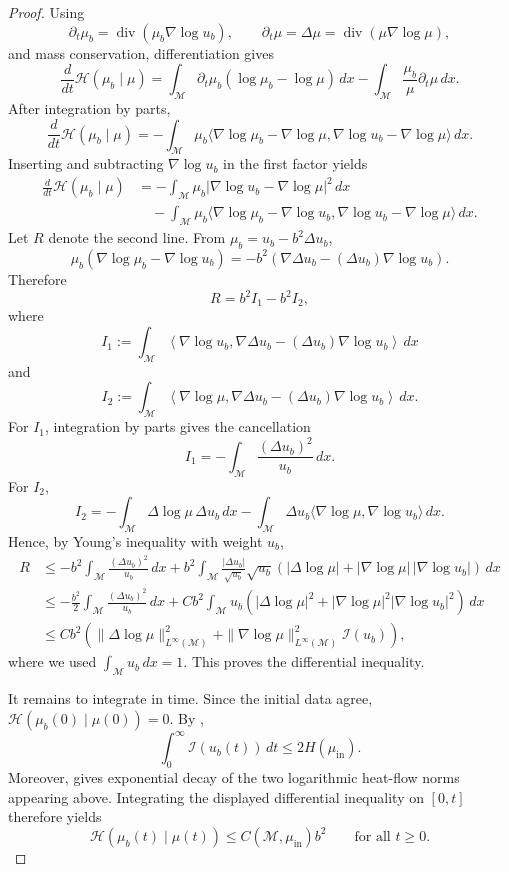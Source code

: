 \documentclass[11pt]{article}
\theoremstyle{definition}
\newcommand{\divg}{\operatorname{div}}
\def\M{\mathcal M}
\begin{document}
\begin{proof}
Using
\[
\partial_t\mu_b=\divg(\mu_b\nabla\log u_b),
\qquad
\partial_t\mu=\Delta\mu=\divg(\mu\nabla\log\mu),
\]
and mass conservation, differentiation gives
\[
\frac{d}{dt}\mathcal H(\mu_b\mid\mu)
=
\int_\M \partial_t\mu_b(\log\mu_b-\log\mu)\,dx
-\int_\M \frac{\mu_b}{\mu}\partial_t\mu\,dx .
\]
After integration by parts,
\[
\frac{d}{dt}\mathcal H(\mu_b\mid\mu)
=
-\int_\M
\mu_b\langle\nabla\log\mu_b-\nabla\log\mu,
\nabla\log u_b-\nabla\log\mu\rangle\,dx .
\]
Inserting and subtracting $\nabla\log u_b$ in the first factor yields
\begin{align*}
\frac{d}{dt}\mathcal H(\mu_b\mid\mu)
&=
-\int_\M \mu_b|\nabla\log u_b-\nabla\log\mu|^2\,dx
\\
&\quad
-\int_\M
\mu_b\langle\nabla\log\mu_b-\nabla\log u_b,
\nabla\log u_b-\nabla\log\mu\rangle\,dx .
\end{align*}
Let $R$ denote the second line.  From
$\mu_b=u_b-b^2\Delta u_b$,
\[
\mu_b(\nabla\log\mu_b-\nabla\log u_b)
=
-b^2\left(\nabla\Delta u_b-(\Delta u_b)\nabla\log u_b\right).
\]
Therefore
\[
R
=
b^2I_1-b^2I_2,
\]
where
\[
I_1:=
\int_\M
\left\langle\nabla\log u_b,
\nabla\Delta u_b-(\Delta u_b)\nabla\log u_b\right\rangle\,dx
\]
and
\[
I_2:=
\int_\M
\left\langle\nabla\log\mu,
\nabla\Delta u_b-(\Delta u_b)\nabla\log u_b\right\rangle\,dx .
\]
For $I_1$, integration by parts gives the cancellation
\[
I_1
=
-\int_\M \frac{(\Delta u_b)^2}{u_b}\,dx .
\]
For $I_2$,
\[
I_2
=
-\int_\M \Delta\log\mu\,\Delta u_b\,dx
-\int_\M \Delta u_b
\langle\nabla\log\mu,\nabla\log u_b\rangle\,dx .
\]
Hence, by Young's inequality with weight $u_b$,
\begin{align*}
R
&\le
-b^2\int_\M \frac{(\Delta u_b)^2}{u_b}\,dx
+b^2\int_\M \frac{|\Delta u_b|}{\sqrt{u_b}}\sqrt{u_b}
\left(
|\Delta\log\mu|
+|\nabla\log\mu|\,|\nabla\log u_b|
\right)\,dx
\\
&\le
-\frac{b^2}{2}\int_\M \frac{(\Delta u_b)^2}{u_b}\,dx
+Cb^2\int_\M u_b
\left(
|\Delta\log\mu|^2
+|\nabla\log\mu|^2|\nabla\log u_b|^2
\right)\,dx
\\
&\le
Cb^2\left(
\|\Delta\log\mu\|_{L^\infty(\M)}^2
+\|\nabla\log\mu\|_{L^\infty(\M)}^2\mathcal I(u_b)
\right),
\end{align*}
where we used $\int_\M u_b\,dx=1$.  This proves the differential inequality.

It remains to integrate in time.  Since the initial data agree,
$\mathcal H(\mu_b(0)\mid\mu(0))=0$.  By
,
\[
\int_0^\infty \mathcal I(u_b(t))\,dt
\le
2H(\mu_{\mathrm{in}}).
\]
Moreover,  gives exponential decay of the two
logarithmic heat-flow norms appearing above.  Integrating the displayed
differential inequality on $[0,t]$ therefore yields
\[
\mathcal H(\mu_b(t)\mid\mu(t))
\le
C(\M,\mu_{\mathrm{in}})b^2
\qquad\text{for all }t\ge0 .
\]
\end{proof}
\end{document}
